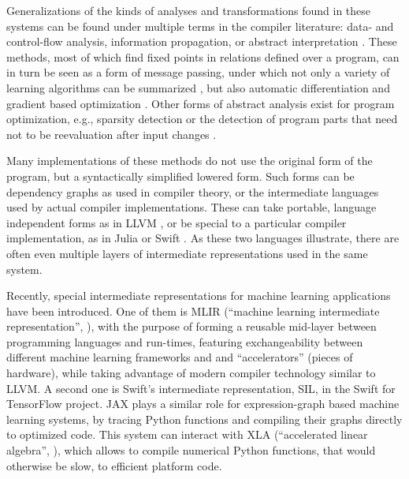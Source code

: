 Generalizations of the kinds of analyses and transformations found in these systems can be found
under multiple terms in the compiler literature: data- and control-flow analysis, information
propagation, or abstract interpretation \parencite{muchnick1997advanced,singer2018static}.  These
methods, most of which find fixed points in relations defined over a program, can in turn be seen as
a form of message passing, under which not only a variety of learning algorithms can be summarized
\parencite{minka2005divergence}, but also automatic differentiation \parencite{minka2019automatic}
and gradient based optimization \parencite{dauwels2005steepest}.  Other forms of abstract analysis
exist for program optimization, e.g., sparsity detection \parencite{gowda2019sparsity} or the
detection of program parts that need not to be reevaluation after input changes
\parencite{becker2020dynamic}.

Many implementations of these methods do not use the original form of the program, but a
syntactically simplified lowered form.  Such forms can be dependency graphs as used in compiler
theory, or the intermediate languages used by actual compiler implementations.  These can take
portable, language independent forms as in LLVM \parencite{llvmproject2019llvm}, or be special to a
particular compiler implementation, as in Julia \parencite{bezanson2017julia} or Swift
\parencite{apple2020swifta}.  As these two languages illustrate, there are often even multiple
layers of intermediate representations used in the same system.

Recently, special intermediate representations for machine learning applications have been
introduced.  One of them is MLIR (\enquote{machine learning intermediate representation},
\textcite{lattner2020mlir}), with the purpose of forming a reusable mid-layer between programming
languages and run-times, featuring exchangeability between different machine learning frameworks and
and \enquote{accelerators} (pieces of hardware), while taking advantage of modern compiler
technology similar to LLVM.  A second one is Swift's intermediate representation, SIL, in the Swift
for TensorFlow project.  JAX \parencite{bradbury2018jax} plays a similar role for expression-graph
based machine learning systems, by tracing Python functions and compiling their graphs directly to
optimized code.  This system can interact with XLA (\enquote{accelerated linear algebra},
\textcite{tensorflowdevelopers2020xla}), which allows to compile numerical Python functions, that
would otherwise be slow, to efficient platform code.

